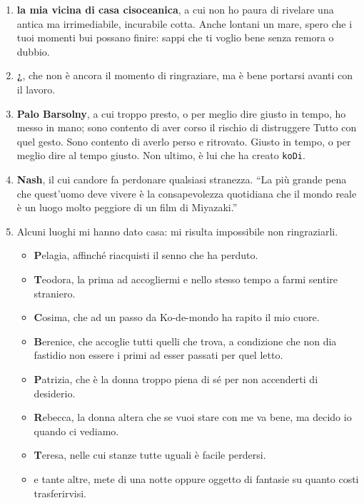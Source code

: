 \begin{enumerate}
\item {\bf la mia vicina di casa cisoceanica}, a cui non ho paura di rivelare una antica ma irrimediabile, incurabile cotta. Anche lontani un mare, spero che i tuoi momenti bui possano finire: sappi che ti voglio bene senza remora o dubbio.
\item {\bf ¿}, che non è ancora il momento di ringraziare, ma è bene portarsi avanti con il lavoro.
\item {\bf Palo Barsolny}, a cui troppo presto, o per meglio dire giusto in tempo, ho messo \cite{McL} in mano; sono contento di aver corso il rischio di distruggere Tutto con quel gesto. Sono contento di averlo perso e ritrovato. Giusto in tempo, o per meglio dire al tempo giusto. Non ultimo, è lui che ha creato {\tt koDi}.
\item {\bf Nash}, il cui candore fa perdonare qualsiasi stranezza. ``La più grande pena che quest'uomo deve vivere è la consapevolezza quotidiana che il mondo reale è un luogo molto peggiore di un film di Miyazaki.''
\item Alcuni luoghi mi hanno dato casa: mi risulta impossibile non ringraziarli.
\begin{itemize}
\item {\bf P}elagia, affinché riacquisti il senno che ha perduto.%
\item {\bf T}eodora, la prima ad accogliermi e nello stesso tempo a farmi sentire straniero. %
\item {\bf C}osima, che ad un passo da Ko\hyp{}de\hyp{}mondo ha rapito il mio cuore. %
\item {\bf B}erenice, che accoglie tutti quelli che trova, a condizione che non dia fastidio non essere i primi ad esser passati per quel letto. %
\item {\bf P}atrizia, che è la donna troppo piena di sé per non accenderti di desiderio. %
\item {\bf R}ebecca, la donna altera che se vuoi stare con me va bene, ma decido io quando ci vediamo. %
\item {\bf T}eresa, nelle cui stanze tutte uguali è facile perdersi. %
\item e tante altre, mete di una notte oppure oggetto di fantasie su quanto costi trasferirvisi.
\end{itemize}
\end{enumerate}
